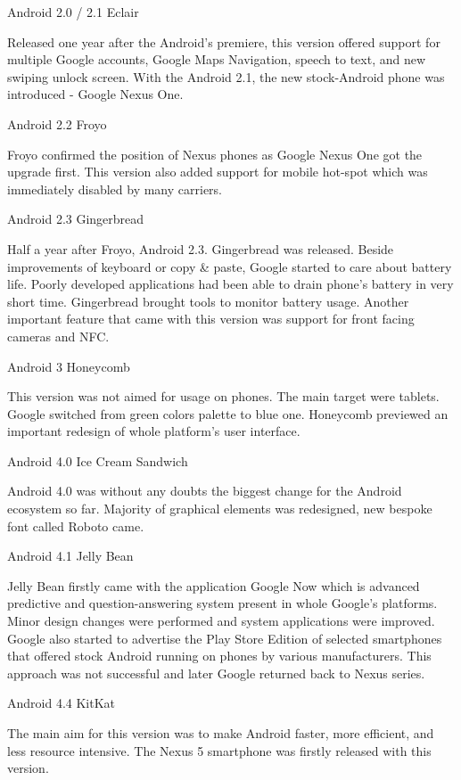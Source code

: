 \seccc Android 2.0 / 2.1 Eclair

Released one year after the Android's premiere, this version offered support for multiple Google accounts, Google Maps Navigation, speech to text, and new swiping unlock screen. With the Android 2.1, the new stock-Android phone was introduced  - Google Nexus One. 

\seccc Android 2.2 Froyo

Froyo confirmed the position of Nexus phones as Google Nexus One got the upgrade first. This version also added support for mobile hot-spot which was immediately disabled by many carriers. 

\seccc Android 2.3 Gingerbread

Half a year after Froyo, Android 2.3. Gingerbread was released. Beside improvements of keyboard or copy \& paste, Google started to care about battery life. Poorly developed applications had been able to drain phone's battery in very short time. Gingerbread brought tools to monitor battery usage. Another important feature that came with this version was support for front facing cameras and NFC.

\seccc Android 3 Honeycomb

This version was not aimed for usage on phones. The main target were tablets. Google switched from green colors palette to blue one. Honeycomb previewed an important redesign of whole platform's user interface.

\seccc Android 4.0 Ice Cream Sandwich

Android 4.0 was without any doubts the biggest change for the Android ecosystem so far. Majority of graphical elements was redesigned, new bespoke font called Roboto came. 

\seccc Android 4.1 Jelly Bean

Jelly Bean firstly came with the application Google Now which is advanced predictive and question-answering system present in whole Google's platforms. Minor design changes were performed and system applications were improved. Google also started to advertise the Play Store Edition of selected smartphones that offered stock Android running on phones by various manufacturers. This approach was not successful and later Google returned back to Nexus series.

\seccc Android 4.4 KitKat

The main aim for this version was to make Android faster, more efficient, and less resource intensive. The Nexus 5 smartphone was firstly released with this version.


